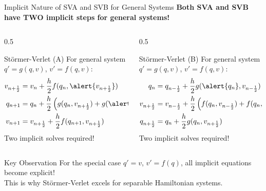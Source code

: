 \documentclass[aspectratio=169]{beamer}
\begin{document}
\begin{frame}{Implicit Nature of SVA and SVB for General Systems}
\small
\textbf{Both SVA and SVB have TWO implicit steps for general systems!}

\vspace{0.2cm}

\begin{columns}
\begin{column}{0.5\textwidth}
\begin{block}{Störmer-Verlet (A)}
\footnotesize
For general system $q' = g(q,v)$, $v' = f(q,v)$:
\begin{align*}
    v_{n+\frac{1}{2}} &= v_n + \frac{h}{2}f(q_n, \alert{v_{n+\frac{1}{2}}}) \\
    q_{n+1} &= q_n + \frac{h}{2}\left(g(q_n, v_{n+\frac{1}{2}}) + g(\alert{q_{n+1}}, v_{n+\frac{1}{2}})\right) \\
    v_{n+1} &= v_{n+\frac{1}{2}} + \frac{h}{2}f(q_{n+1}, v_{n+\frac{1}{2}})
\end{align*}
\vspace{-0.1cm}
\centering
\alert{Two implicit solves required!}
\end{block}
\end{column}

\begin{column}{0.5\textwidth}
\begin{block}{Störmer-Verlet (B)}
\footnotesize
For general system $q' = g(q,v)$, $v' = f(q,v)$:
\begin{align*}
    q_n &= q_{n-\frac{1}{2}} + \frac{h}{2}g(\alert{q_n}, v_{n-\frac{1}{2}}) \\
    v_{n+\frac{1}{2}} &= v_{n-\frac{1}{2}} + \frac{h}{2}\left(f(q_n, v_{n-\frac{1}{2}}) + f(q_n, \alert{v_{n+\frac{1}{2}}})\right) \\
    q_{n+\frac{1}{2}} &= q_n + \frac{h}{2}g(q_n, v_{n+\frac{1}{2}})
\end{align*}
\vspace{-0.1cm}
\centering
\alert{Two implicit solves required!}
\end{block}
\end{column}
\end{columns}

\vspace{0.3cm}

\begin{block}{Key Observation}
\centering
For the special case $q' = v$, $v' = f(q)$, all implicit equations become \alert{explicit}!\\
This is why Störmer-Verlet excels for separable Hamiltonian systems.
\end{block}
\end{frame}
\end{document}
